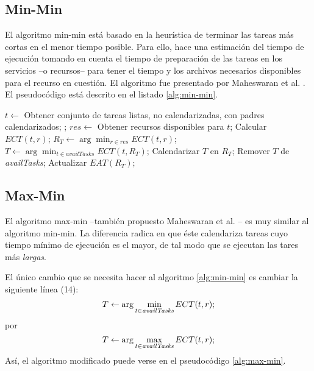 \subsection{Min-Min}
El algoritmo min-min está basado en la heurística de terminar las tareas más cortas en el menor tiempo posible. Para ello, hace una estimación del tiempo de ejecución tomando en cuenta el tiempo de preparación de las tareas en los servicios --o recursos-- para tener el tiempo y los archivos necesarios disponibles para el recurso en cuestión. El algoritmo fue presentado por Maheswaran et al. \cite{maheswaran1999dynamic}. El pseudocódigo está descrito en el listado \ref{alg:min-min}.

\label{alg:min-min}
\begin{algorithmic}[1]
	\State $t \gets$ Obtener conjunto de tareas listas, no calendarizadas, con padres  calendarizados;
	\State {};
\EndWhile
{}
			\State $res \gets$ Obtener recursos disponibles para $t$;
				\State Calcular $ECT(t,r)$;
			\EndFor
			\State $R_T \gets \arg\min_{r \in res}ECT(t,r)$;
		\EndFor
		\State $T \gets \arg\min_{t \in availTasks}ECT(t,R_T)$;
		\State Calendarizar $T$ en $R_T$;
		\State Remover $T$ de \emph{availTasks};
		\State Actualizar $EAT(R_T)$;
	\EndWhile
\EndProcedure
\end{algorithmic}

\subsection{Max-Min}
El algoritmo max-min --también propuesto Maheswaran et al. \cite{maheswaran1999dynamic}-- es muy similar al algoritmo min-min. La diferencia radica en que éste calendariza tareas cuyo tiempo mínimo de ejecución es el mayor, de tal modo que se ejecutan las tares más \emph{largas}.

El único cambio que se necesita hacer al algoritmo \ref{alg:min-min} es cambiar la siguiente línea (14):
\[T \leftarrow \arg\min_{t \in \emph{availTasks}}ECT(t,r);\]
por
\[T \leftarrow \arg\max_{t \in \emph{availTasks}}ECT(t,r);\]
Así, el algoritmo modificado puede verse en el pseudocódigo \ref{alg:max-min}.

